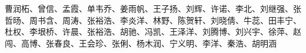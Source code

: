 \documentclass[11pt]{book} %
\begin{document}
\newpage
~\vfill
\thispagestyle{empty}

{\large
{} \\

\noindent 曹润柘、曾信、孟霞、单韦乔、姜雨帆、王子扬、刘辉、许诺、李北、刘继强、张哲旸、周书含、周涛、张裕浩、李炎洋、林野、陈贺轩、刘晓倩、牛蕊、田丰宁、杜权、李垠桥、许晨、张裕浩、胡驰、冯凯、王泽洋、刘腾博、刘兴宇、徐萍、赵闯、高博、张春良、王会珍、张俐、杨木润、宁义明、李洋、秦浩、胡明涵 \\
}

\newpage


{} %
\pagestyle{empty} %
\tableofcontents %
\cleardoublepage %
\pagestyle{fancy} %













\cleardoublepage %
\printbibliography


\cleardoublepage %
\printindex %


\end{document}

